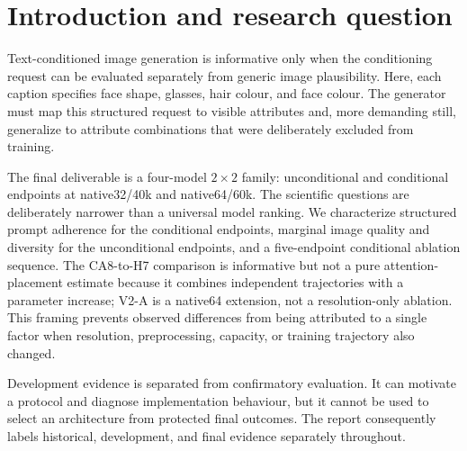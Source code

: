 \section{Introduction and research question}\label{sec:introduction}
Text-conditioned image generation is informative only when the conditioning request can be evaluated separately from generic image plausibility. Here, each caption specifies face shape, glasses, hair colour, and face colour. The generator must map this structured request to visible attributes and, more demanding still, generalize to attribute combinations that were deliberately excluded from training.

The final deliverable is a four-model $2\times2$ family: unconditional and conditional endpoints at native32/40k and native64/60k. The scientific questions are deliberately narrower than a universal model ranking. We characterize structured prompt adherence for the conditional endpoints, marginal image quality and diversity for the unconditional endpoints, and a five-endpoint conditional ablation sequence. The CA8-to-H7 comparison is informative but not a pure attention-placement estimate because it combines independent trajectories with a parameter increase; V2-A is a native64 extension, not a resolution-only ablation. This framing prevents observed differences from being attributed to a single factor when resolution, preprocessing, capacity, or training trajectory also changed.

Development evidence is separated from confirmatory evaluation. It can motivate a protocol and diagnose implementation behaviour, but it cannot be used to select an architecture from protected final outcomes. The report consequently labels historical, development, and final evidence separately throughout.
